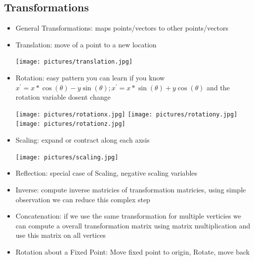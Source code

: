 \documentclass[11pt,a4paper]{article}
\begin{document}
	\subsection{Transformations}
	\begin{itemize}
		\item General Transformations: maps points/vectors to other points/vectors
		\item Translation: move of a point to a new location
		\begin{center}
			\texttt{[image: pictures/translation.jpg]}
		\end{center}
		\item Rotation: easy pattern you can learn if you know $x^{'} = x*\cos(\theta)-y\sin(\theta); x^{'} = x*\sin(\theta)+y\cos(\theta)$ and the rotation variable dosent change
		\begin{center}
			\texttt{[image: pictures/rotationx.jpg]}
			\texttt{[image: pictures/rotationy.jpg]}
			\texttt{[image: pictures/rotationz.jpg]}
		\end{center}
		\item Scaling: expand or contract along each axsis
			\begin{center}
			\texttt{[image: pictures/scaling.jpg]}
		\end{center}		
		\item Reflection: special case of Scaling, negative scaling variables
		\item Inverse: compute inverse matricies of transformation matricies, using simple observation we can reduce this complex step
		\item Concatenation: if we use the same transformation for multiple verticies we can compute a overall transformation matrix using matrix multiplication and use this matrix on all vertices
		\item Rotation about a Fixed Point: Move fixed point to origin, Rotate, move back
	\end{itemize}
\end{document}
